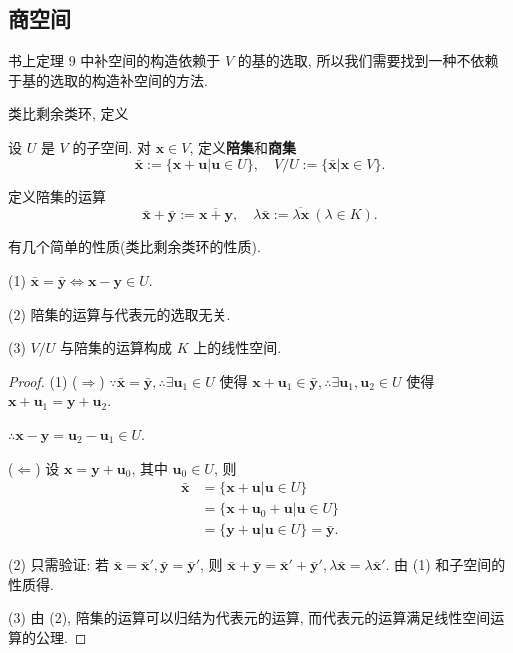 \documentclass[color=black,device=normal,lang=cn,mode=geye]{elegantnote}
\begin{document}
\subsection{商空间}
书上定理 9 中补空间的构造依赖于 $V$ 的基的选取, 所以我们需要找到一种不依赖于基的选取的构造补空间的方法.

类比剩余类环, 定义
\begin{definition}
    设 $U$ 是 $V$ 的子空间. 对 $\boldsymbol{x}\in V$, 定义\textbf{陪集}和\textbf{商集}
    \[\bar{\boldsymbol{x}}:=\{\boldsymbol{x}+\boldsymbol{u}|\boldsymbol{u}\in U\},\quad V/U:=\{\bar{\boldsymbol{x}}|\boldsymbol{x}\in V\}.\]

    定义陪集的运算
    \[\bar{\boldsymbol{x}}+\bar{\boldsymbol{y}}:=\overline{\boldsymbol{x}+\boldsymbol{y}},\quad\lambda\bar{\boldsymbol{x}}:=\overline{\lambda\boldsymbol{x}}\ (\lambda\in K).\]
\end{definition}
有几个简单的性质(类比剩余类环的性质).
\begin{property}\label{p1.3}
    (1) $\bar{\boldsymbol{x}}=\bar{\boldsymbol{y}}\Leftrightarrow\boldsymbol{x}-\boldsymbol{y}\in U$.

    (2) 陪集的运算与代表元的选取无关.

    (3) $V/U$ 与陪集的运算构成 $K$ 上的线性空间.
\end{property}
\begin{proof}
    (1) ($\Rightarrow$) $\because\bar{\boldsymbol{x}}=\bar{\boldsymbol{y}},\therefore\exists\boldsymbol{u}_1\in U$ 使得 $\boldsymbol{x}+\boldsymbol{u}_1\in\bar{\boldsymbol{y}},\therefore\exists\boldsymbol{u}_1,\boldsymbol{u}_2\in U$ 使得 $\boldsymbol{x}+\boldsymbol{u}_1=\boldsymbol{y}+\boldsymbol{u}_2$.

    $\therefore\boldsymbol{x}-\boldsymbol{y}=\boldsymbol{u}_2-\boldsymbol{u}_1\in U$.

    ($\Leftarrow$) 设 $\boldsymbol{x}=\boldsymbol{y}+\boldsymbol{u}_0$, 其中 $\boldsymbol{u}_0\in U$, 则
    \begin{align*}
        \bar{\boldsymbol{x}} & =\{\boldsymbol{x}+\boldsymbol{u}|\boldsymbol{u}\in U\} \\
        & =\{\boldsymbol{x}+\boldsymbol{u}_0+\boldsymbol{u}|\boldsymbol{u}\in U\} \\
        & =\{\boldsymbol{y}+\boldsymbol{u}|\boldsymbol{u}\in U\}=\bar{\boldsymbol{y}}.
    \end{align*}

    (2) 只需验证: 若 $\bar{\boldsymbol{x}}=\bar{\boldsymbol{x}}',\bar{\boldsymbol{y}}=\bar{\boldsymbol{y}}'$, 则 $\bar{\boldsymbol{x}}+\bar{\boldsymbol{y}}=\bar{\boldsymbol{x}}'+\bar{\boldsymbol{y}}',\lambda\bar{\boldsymbol{x}}=\lambda\bar{\boldsymbol{x}}'$. 由 (1) 和子空间的性质得.

    (3) 由 (2), 陪集的运算可以归结为代表元的运算, 而代表元的运算满足线性空间运算的公理.
\end{proof}
\end{document}
